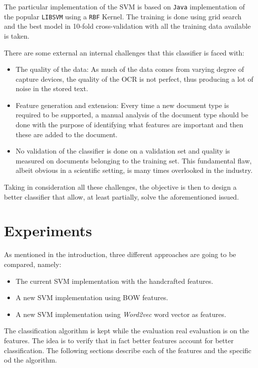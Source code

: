 The particular implementation of the \ac{SVM} is based on \texttt{Java}
implementation of the popular \texttt{LIBSVM} \cite{CC01a} using a
\texttt{RBF} Kernel.  The training is done using grid search and the best
model in 10-fold cross-validation with all the training data available is
taken.

There are some external an internal challenges that this classifier is faced
with:

\begin{itemize}
\item The quality of the data: As much of the data comes from varying degree
  of capture devices, the quality of the OCR is not perfect, thus producing a
  lot of noise in the stored text.
\item Feature generation and extension: Every time a new document type is
  required to be supported, a manual analysis of the document type should be
  done with the purpose of identifying what features are important and then
  these are added to the document.
\item No validation of the classifier is done on a validation set and quality
  is measured on documents belonging to the training set. This fundamental
  flaw, albeit obvious in a scientific setting, is many times overlooked in
  the industry.
\end{itemize}

Taking in consideration all these challenges, the objective is then to design
a better classifier that allow, at least partially, solve the
aforementioned issued.



\section{Experiments}
\label{sec:w2vec_doctype_experimental_setup}

As mentioned in the introduction, three different approaches are going to be
compared, namely:

\begin{itemize}
\item The current \ac{SVM} implementation with the handcrafted features.
\item A new \ac{SVM} implementation using \ac{BOW} features.
\item A new \ac{SVM} implementation using \textit{Word2vec} word vector as features.
\end{itemize}

The classification algorithm is kept while the
evaluation real evaluation is on the features. The idea  is to verify
that in fact better features account for better classification. The following
sections describe each of the features and the specific od the algorithm. 


